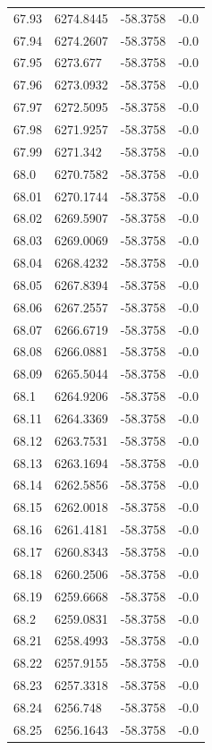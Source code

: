 \begin{table}[H]
\begin{tabular}{llll}
67.93 & 6274.8445 & -58.3758 & -0.0 \\
67.94 & 6274.2607 & -58.3758 & -0.0 \\
67.95 & 6273.677 & -58.3758 & -0.0 \\
67.96 & 6273.0932 & -58.3758 & -0.0 \\
67.97 & 6272.5095 & -58.3758 & -0.0 \\
67.98 & 6271.9257 & -58.3758 & -0.0 \\
67.99 & 6271.342 & -58.3758 & -0.0 \\
68.0 & 6270.7582 & -58.3758 & -0.0 \\
68.01 & 6270.1744 & -58.3758 & -0.0 \\
68.02 & 6269.5907 & -58.3758 & -0.0 \\
68.03 & 6269.0069 & -58.3758 & -0.0 \\
68.04 & 6268.4232 & -58.3758 & -0.0 \\
68.05 & 6267.8394 & -58.3758 & -0.0 \\
68.06 & 6267.2557 & -58.3758 & -0.0 \\
68.07 & 6266.6719 & -58.3758 & -0.0 \\
68.08 & 6266.0881 & -58.3758 & -0.0 \\
68.09 & 6265.5044 & -58.3758 & -0.0 \\
68.1 & 6264.9206 & -58.3758 & -0.0 \\
68.11 & 6264.3369 & -58.3758 & -0.0 \\
68.12 & 6263.7531 & -58.3758 & -0.0 \\
68.13 & 6263.1694 & -58.3758 & -0.0 \\
68.14 & 6262.5856 & -58.3758 & -0.0 \\
68.15 & 6262.0018 & -58.3758 & -0.0 \\
68.16 & 6261.4181 & -58.3758 & -0.0 \\
68.17 & 6260.8343 & -58.3758 & -0.0 \\
68.18 & 6260.2506 & -58.3758 & -0.0 \\
68.19 & 6259.6668 & -58.3758 & -0.0 \\
68.2 & 6259.0831 & -58.3758 & -0.0 \\
68.21 & 6258.4993 & -58.3758 & -0.0 \\
68.22 & 6257.9155 & -58.3758 & -0.0 \\
68.23 & 6257.3318 & -58.3758 & -0.0 \\
68.24 & 6256.748 & -58.3758 & -0.0 \\
68.25 & 6256.1643 & -58.3758 & -0.0 \\

\end{tabular}
\end{table}
